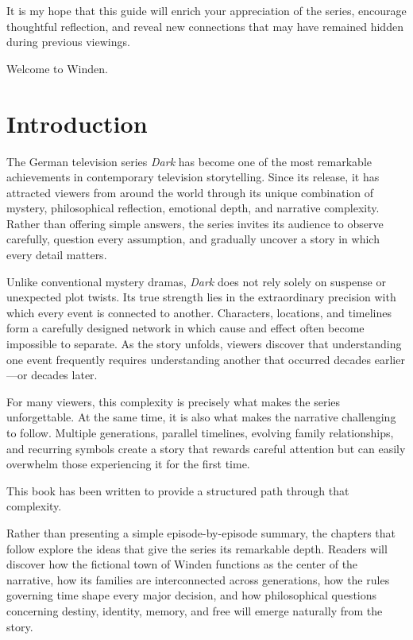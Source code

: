 \documentclass[12pt,oneside,openany]{book}
\begin{document}
It is my hope that this guide will enrich your appreciation of the series,
encourage thoughtful reflection, and reveal new connections that may have
remained hidden during previous viewings.

Welcome to Winden.


\tableofcontents
\mainmatter

\chapter*{Introduction}

The German television series \textit{Dark} has become one of the most remarkable achievements in contemporary television storytelling. Since its release, it has attracted viewers from around the world through its unique combination of mystery, philosophical reflection, emotional depth, and narrative complexity. Rather than offering simple answers, the series invites its audience to observe carefully, question every assumption, and gradually uncover a story in which every detail matters.

Unlike conventional mystery dramas, \textit{Dark} does not rely solely on suspense or unexpected plot twists. Its true strength lies in the extraordinary precision with which every event is connected to another. Characters, locations, and timelines form a carefully designed network in which cause and effect often become impossible to separate. As the story unfolds, viewers discover that understanding one event frequently requires understanding another that occurred decades earlier—or decades later.

For many viewers, this complexity is precisely what makes the series unforgettable. At the same time, it is also what makes the narrative challenging to follow. Multiple generations, parallel timelines, evolving family relationships, and recurring symbols create a story that rewards careful attention but can easily overwhelm those experiencing it for the first time.

This book has been written to provide a structured path through that complexity.

Rather than presenting a simple episode-by-episode summary, the chapters that follow explore the ideas that give the series its remarkable depth. Readers will discover how the fictional town of Winden functions as the center of the narrative, how its families are interconnected across generations, how the rules governing time shape every major decision, and how philosophical questions concerning destiny, identity, memory, and free will emerge naturally from the story.
\end{document}
